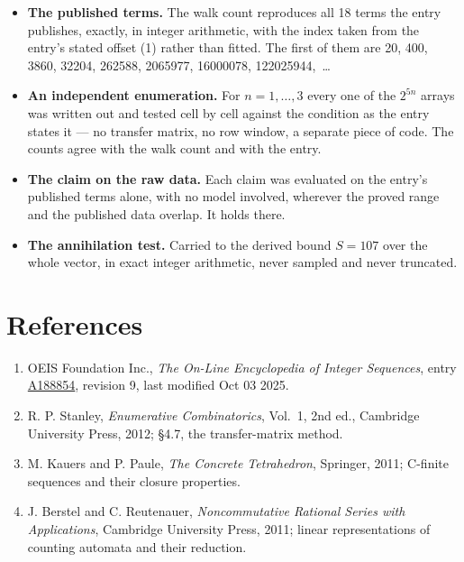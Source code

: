 \documentclass[11pt]{article}
\theoremstyle{definition}
\begin{document}
\begin{itemize}

\item {\bfseries The published terms.} The walk count reproduces all 18 terms the entry publishes, exactly, in integer arithmetic, with the index taken from the entry's stated offset (1) rather than fitted. The first of them are 20, 400, 3860, 32204, 262588, 2065977, 16000078, 122025944,~\dots

\item {\bfseries An independent enumeration.} For $n = 1,\dots,3$ every one of the $2^{5n}$ arrays was written out and tested cell by cell against the condition as the entry states it --- no transfer matrix, no row window, a separate piece of code. The counts agree with the walk count and with the entry.

\item {\bfseries The claim on the raw data.} Each claim was evaluated on the entry's published terms alone, with no model involved, wherever the proved range and the published data overlap. It holds there.

\item {\bfseries The annihilation test.} Carried to the derived bound $S = 107$ over the whole vector, in exact integer arithmetic, never sampled and never truncated.

\end{itemize}

\section{References}

\begin{enumerate}

\item OEIS Foundation Inc., \emph{The On-Line Encyclopedia of Integer Sequences}, entry \href{https://oeis.org/A188854}{A188854}, revision 9, last modified Oct 03 2025.

\item R. P. Stanley, \emph{Enumerative Combinatorics}, Vol.~1, 2nd ed., Cambridge University Press, 2012; \S4.7, the transfer-matrix method.

\item M. Kauers and P. Paule, \emph{The Concrete Tetrahedron}, Springer, 2011; C-finite sequences and their closure properties.

\item J. Berstel and C. Reutenauer, \emph{Noncommutative Rational Series with Applications}, Cambridge University Press, 2011; linear representations of counting automata and their reduction.

\end{enumerate}
\end{document}

